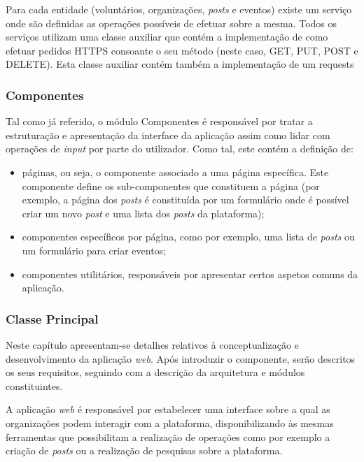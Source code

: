 \par \medskip

Para cada entidade (voluntários, organizações, \textit{posts} e eventos) existe um serviço onde são definidas as operações possíveis de efetuar sobre a mesma. Todos os serviços utilizam uma classe auxiliar que contém a implementação de como efetuar pedidos HTTPS consoante o seu método (neste caso, GET, PUT, POST e DELETE). Esta classe auxiliar contém também a implementação de um requests

\subsubsection{Componentes}

Tal como já referido, o módulo Componentes é responsável por tratar a estruturação e apresentação da interface da aplicação assim como lidar com operações de \textit{input} por parte do utilizador. Como tal, este contém a definição de:

\begin{itemize}
	\item páginas, ou seja, o componente associado a uma página específica. Este componente define os sub-componentes que constituem a página (por exemplo, a página dos \textit{posts} é constituída por um formulário onde é possível criar um novo \textit{post} e uma lista dos \textit{posts} da plataforma);
	\item componentes específicos por página, como por exemplo, uma lista de \textit{posts} ou um formulário para criar eventos;
	\item componentes utilitários, responsáveis por apresentar certos aspetos comuns da aplicação.
\end{itemize}

\subsubsection{Classe Principal}

\iffalse

Neste capítulo apresentam-se detalhes relativos à conceptualização e desenvolvimento da aplicação \textit{web}. Após introduzir o componente, serão descritos os seus requisitos, seguindo com a descrição da arquitetura e módulos constituintes.

\par \medskip

A aplicação \textit{web} é responsável por estabelecer uma interface sobre a qual as organizações podem interagir com a plataforma, disponibilizando às mesmas ferramentas que possibilitam a realização de operações como por exemplo a criação de \textit{posts} ou a realização de pesquisas sobre a plataforma.


